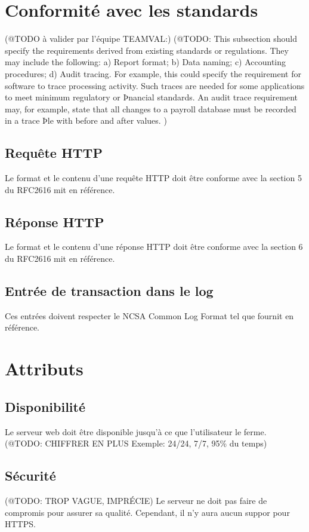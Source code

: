 \documentclass{scrreprt}
\begin{document}
\section{Conformité avec les standards}
(@TODO à valider par l'équipe TEAMVAL:)
(@TODO: This subsection should specify the requirements derived from existing standards or regulations. They may
include the following:
   a)    Report format;
   b)    Data naming;
   c)    Accounting procedures;
   d)    Audit tracing.
For example, this could specify the requirement for software to trace processing activity. Such traces are
needed for some applications to meet minimum regulatory or Þnancial standards. An audit trace requirement
may, for example, state that all changes to a payroll database must be recorded in a trace Þle with before and
after values.
)
\subsection{Requête HTTP}
Le format et le contenu d'une requête HTTP doit être conforme avec la section 5 du RFC2616\cite{http1.0} mit en référence.
\subsection{Réponse HTTP}
Le format et le contenu d'une réponse HTTP doit être conforme avec la section 6 du RFC2616\cite{http1.0} mit en référence.
\subsection{Entrée de transaction dans le log}
Ces entrées doivent respecter le NCSA Common Log Format\cite{NCSA} tel que fournit en référence.



\section{Attributs}
\subsection{Disponibilité}
Le serveur web doit être disponible jusqu'à ce que l'utilisateur le ferme. \\
(@TODO: CHIFFRER EN PLUS Exemple: 24/24, 7/7, 95\% du temps)
\subsection{Sécurité}
(@TODO: TROP VAGUE, IMPRÉCIE)
Le serveur ne doit pas faire de compromis pour assurer sa qualité. Cependant, il n'y aura aucun suppor pour HTTPS.
\end{document}
